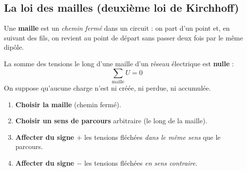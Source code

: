 \documentclass[11pt,a4paper]{article}
\begin{document}
\subsection{La loi des mailles (deuxième loi de Kirchhoff)}

\begin{definition}[maille]
Une \textbf{maille} est un \emph{chemin fermé} dans un circuit : on part d'un point et, en suivant
des fils, on revient au point de départ sans passer deux fois par le même dipôle.
\end{definition}

\begin{theoreme}
La somme des tensions le long d'une maille d'un réseau électrique est \textbf{nulle} :
\[ \boxed{\;\sum_{\text{maille}} U = 0\;} \]
On suppose qu'aucune charge n'est ni créée, ni perdue, ni accumulée.
\end{theoreme}

\begin{methode}
\begin{enumerate}[leftmargin=1.8em,topsep=2pt,itemsep=1pt]
  \item \textbf{Choisir la maille} (chemin fermé).
  \item \textbf{Choisir un sens de parcours} arbitraire (le long de la maille).
  \item \textbf{Affecter du signe $+$} les tensions fléchées \emph{dans le même sens} que le parcours.
  \item \textbf{Affecter du signe $-$} les tensions fléchées \emph{en sens contraire}.
\end{enumerate}
\end{methode}
\end{document}
